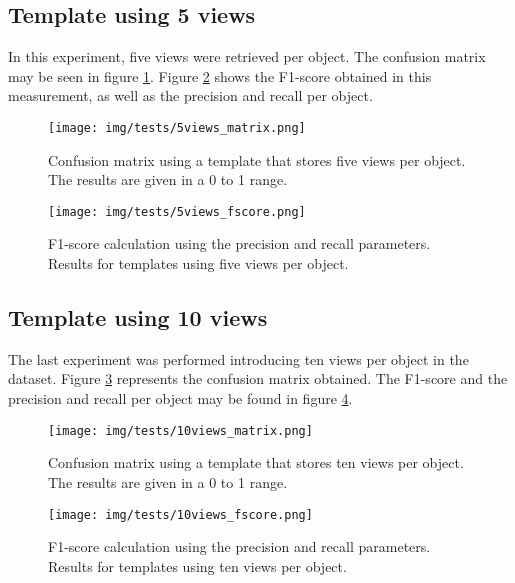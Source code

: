 \subsection{Template using 5 views}
In this experiment, five views were retrieved per object. 
The confusion matrix may be seen in figure \ref{5views_matrix}. 
Figure \ref{5views_fscore} shows the F1-score obtained in this measurement, as well as the precision and recall per object. 
	\begin{figure}[H]
		\begin{center}
	    \texttt{[image: img/tests/5views\_matrix.png]}
		\caption[Confusion matrix - templates using 5 views]{Confusion matrix using a template that stores five views per object. The results are given in a 0 to 1 range. }
		\label{5views_matrix}
		\end{center}
	\end{figure}

	\begin{figure}[H]
		\begin{center}
		\texttt{[image: img/tests/5views\_fscore.png]}
		\caption[F1-score - templates using 5 views]{F1-score calculation using the precision and recall parameters. Results for templates using five views per object. }
		\label{5views_fscore}
		\end{center}
	\end{figure}



\subsection{Template using 10 views}
The last experiment was performed introducing ten views per object in the dataset. 
Figure \ref{10views_matrix} represents the confusion matrix obtained. 
The F1-score and the precision and recall per object may be found in figure \ref{10views_fscore}.
	\begin{figure}[H]
		\begin{center}
	    \texttt{[image: img/tests/10views\_matrix.png]}
		\caption[Confusion matrix - templates using 10 views]{Confusion matrix using a template that stores ten views per object. The results are given in a 0 to 1 range. }
		\label{10views_matrix}
		\end{center}
	\end{figure}

	\begin{figure}[H]
		\begin{center}
		\texttt{[image: img/tests/10views\_fscore.png]}
		\caption[F1-score - templates using 10 views]{F1-score calculation using the precision and recall parameters. Results for templates using ten views per object. }
		\label{10views_fscore}
		\end{center}
	\end{figure}

